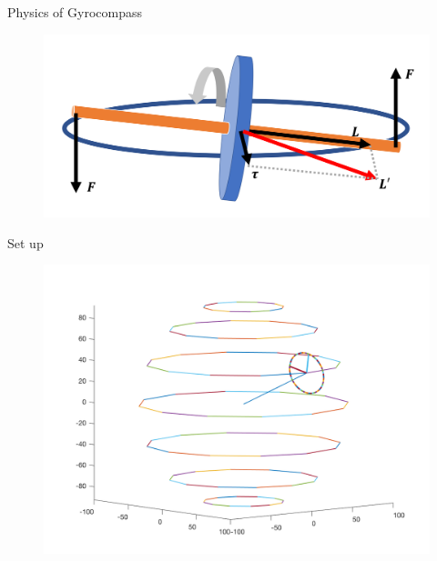 \documentclass[10pt]{beamer}
\begin{document}
\begin{frame}{Physics of Gyrocompass}
    \begin{figure}
		\centering
		\includegraphics[width=\textwidth]{gyrocompass_physics.png}
	\end{figure}
\end{frame}

\begin{frame}{Set up}
\begin{figure}
		\centering
		\includegraphics[width=\textwidth]{track_structure.png}
	\end{figure}
\end{frame}
\end{document}

